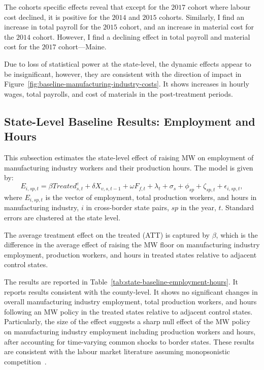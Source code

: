 \documentclass[authoryear, preprint, twocolumn, 1p]{elsarticle}
\begin{document}
    The cohorts specific effects reveal that except for the $2017$ cohort where labour cost declined, it is positive for the $2014$ and $2015$ cohorts. Similarly, I find an increase in total payroll for the $2015$ cohort, and an increase in material cost for the $2014$ cohort. However, I find a declining effect in total payroll and material cost for the $2017$ cohort---Maine.
    
    

    Due to loss of statistical power at the state-level, the dynamic effects appear to be insignificant, however, they are consistent with the direction of impact in Figure~\ref{fig:baseline-manufacturing-industry-costs}. It shows increases in hourly wages, total payrolls, and cost of materials in the post-treatment periods.

    \subsection{State-Level Baseline Results: Employment and Hours}\label{subsec:state-level-baseline-results-employment-and-hours}
    This subsection estimates the state-level effect of raising MW on employment of manufacturing industry workers and their production hours. The model is given by:
    \begin{equation}
        E_{i,sp,t} = \beta Treated_{s,t}^e + \delta X_{v,s,t-1} + \omega F_{f,t} + \lambda_{t} + \sigma_{s} + \phi_{sp} + \zeta_{sp,t} + \epsilon_{i,sp,t},\label{eq:state-baseline-emp-hours}
    \end{equation}
    where $E_{i,sp,t}$ is the vector of employment, total production workers, and hours in manufacturing industry, $i$ in cross-border state pairs, $sp$ in the year, $t$. Standard errors are clustered at the state level.
    

    The average treatment effect on the treated (ATT) is captured by $\beta$, which is the difference in the average effect of raising the MW floor on manufacturing industry employment, production workers, and hours in treated states relative to adjacent control states.

    The results are reported in Table~\ref{tab:state-baseline-employment-hours}. It reports results consistent with the county-level. It shows no significant changes in overall manufacturing industry employment, total production workers, and hours following an MW policy in the treated states relative to adjacent control states. Particularly, the size of the effect suggests a sharp null effect of the MW policy on manufacturing industry employment including production workers and hours, after accounting for time-varying common shocks to border states. These results are consistent with the labour market literature assuming monopsonistic competition~\citep{card2000minimum, aaronson2018industry, cengiz2019effect, wong2019minimum, dustmann2022reallocation}.
\end{document}
